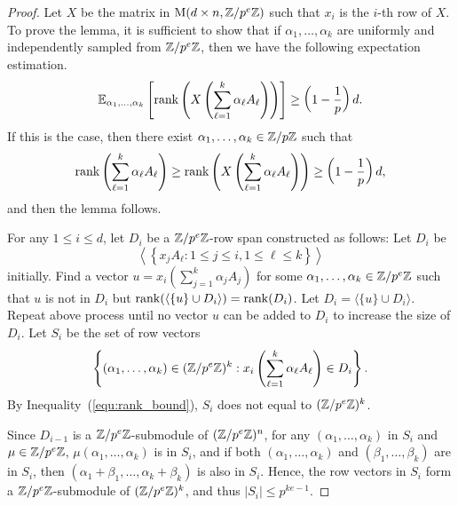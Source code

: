 \begin{proof}
Let $X$ be the matrix in $\mathrm{M}(d\times n, \mathbb{Z} / p^e \mathbb{Z})$ such that $x_i$ is the $i$-th row of $X$.
To prove the lemma, it is sufficient to show that if
$\alpha_1, \dots, \alpha_k $ are uniformly and independently  sampled from $\mathbb{Z} / p^e \mathbb{Z}$, then
we have the following expectation estimation. %
\[\mathbb{E}_{\alpha_1, \dots, \alpha_k}\left[\rank \left({X \left(\sum_{\ell=1}^k \alpha_\ell A_\ell\right) }\right)\right] \geq \left(1 - \frac{1}{p}\right)d.\]
If this is the case, then there exist $\alpha_1, \dots, \alpha_k \in \mathbb{Z} / p \mathbb{Z}$ such that 
\[\rank{ \left(\sum_{\ell=1}^k \alpha_\ell A_\ell \right)} \geq \rank {\left(X \left(\sum_{\ell=1}^k \alpha_\ell A_\ell\right) \right)} \geq \left(1 - \frac{1}{p}\right)d, \]
and then the lemma follows. 

For any $1 \leq i \leq d$, 
let $D_i$ be a $\mathbb{Z} / p^e \mathbb{Z}$-row span constructed as follows:
Let $D_i$ be \[\left\langle \left\{x_j A_\ell : 1 \leq j \leq i, 1 \leq \ell \leq k\right\}\right\rangle\] initially. 
Find a vector $u = x_i (\sum_{j = 1}^k \alpha_j A_j)$ for some $\alpha_1, \dots, \alpha_k \in \mathbb{Z} / p^e \mathbb{Z}$ such that $u$ is not in $D_i$ but $\rank(\langle \{u\}\cup D_i \rangle) = \rank(D_i)$. 
Let $D_i = \langle \{u\}\cup D_i \rangle$. 
Repeat above process until no vector $u$  can be added to $D_i$ to increase the size of $D_i$. 
Let $S_i$ be the set of row vectors
\[\left\{(\alpha_1, \dots, \alpha_k) \in (\mathbb{Z} / p^e \mathbb{Z})^k : x_i \left(\sum_{\ell = 1}^k \alpha_\ell A_\ell \right) \in D_{i}\right\}.\]
By Inequality~(\ref{equ:rank_bound}), $S_i$ does not equal to $(\mathbb{Z} / p^e \mathbb{Z})^k$.


Since $D_{i-1}$ is a $\mathbb{Z} / p^e \mathbb{Z}$-submodule of $(\mathbb{Z} / p^e \mathbb{Z})^n$, 
for any $(\alpha_1, \dots, \alpha_k)$ in $S_i$ and $\mu \in \mathbb{Z} / p^e \mathbb{Z}$, $\mu (\alpha_1, \dots, \alpha_k)$ is in $S_i$, and 
if both $(\alpha_1, \dots, \alpha_k)$ and $(\beta_1, \dots, \beta_k)$ are in $S_i$, then $(\alpha_1 + \beta_1, \dots, \alpha_k + \beta_k)$ is also in $S_i$. 
Hence, the row vectors in $S_i$ form a $\mathbb{Z} / p^e \mathbb{Z}$-submodule of $(\mathbb{Z} / p^e \mathbb{Z})^k$, and thus 
$|S_i| \leq p^{k e-1}$.



\end{proof}
